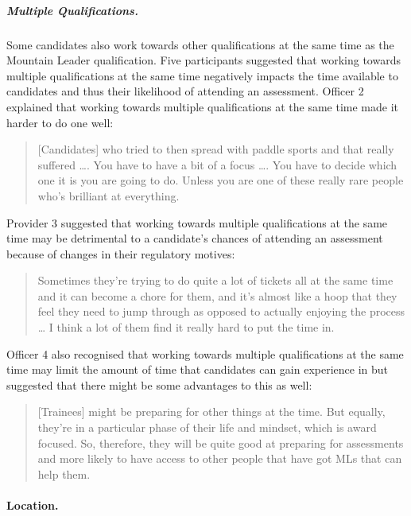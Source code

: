 \documentclass[
  12pt,
  a4paper,
]{book}
\begin{document}
\hypertarget{multiple-qualifications.}{%
\subparagraph{Multiple Qualifications.}\label{multiple-qualifications.}}

Some candidates also work towards other qualifications at the same time as the Mountain Leader qualification. Five participants suggested that working towards multiple qualifications at the same time negatively impacts the time available to candidates and thus their likelihood of attending an assessment. Officer 2 explained that working towards multiple qualifications at the same time made it harder to do one well:

\begin{quote}
{[}Candidates{]} who tried to then spread with paddle sports and that really suffered \ldots. You have to have a bit of a focus \ldots. You have to decide which one it is you are going to do. Unless you are one of these really rare people who's brilliant at everything.
\end{quote}

Provider 3 suggested that working towards multiple qualifications at the same time may be detrimental to a candidate's chances of attending an assessment because of changes in their regulatory motives:

\begin{quote}
Sometimes they're trying to do quite a lot of tickets all at the same time and it can become a chore for them, and it's almost like a hoop that they feel they need to jump through as opposed to actually enjoying the process \ldots{} I think a lot of them find it really hard to put the time in.
\end{quote}

Officer 4 also recognised that working towards multiple qualifications at the same time may limit the amount of time that candidates can gain experience in but suggested that there might be some advantages to this as well:

\begin{quote}
{[}Trainees{]} might be preparing for other things at the time. But equally, they're in a particular phase of their life and mindset, which is award focused. So, therefore, they will be quite good at preparing for assessments and more likely to have access to other people that have got MLs that can help them.
\end{quote}

\hypertarget{qual-gta-location}{%
\paragraph{Location.}\label{qual-gta-location}}
\end{document}
